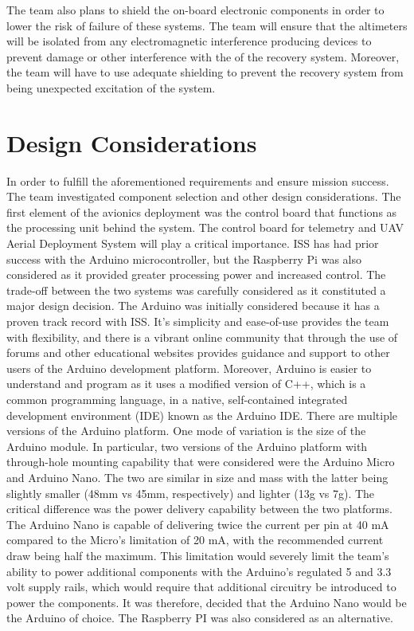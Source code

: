 The team also plans to shield the on-board electronic components in order to lower the risk of failure of these systems. The team will ensure that the altimeters will be isolated from any electromagnetic interference producing devices to prevent damage or other interference with the of the recovery system. Moreover, the team will have to use adequate shielding to prevent the recovery system from being unexpected excitation of the system.

\section{Design Considerations}

In order to fulfill the aforementioned requirements and ensure mission success. The team investigated component selection and other design considerations. The first element of the avionics deployment was the control board that functions as the processing unit behind the system.
The control board for telemetry and UAV Aerial Deployment System will play a critical importance. ISS has had prior success with the Arduino microcontroller, but the Raspberry Pi was also considered as it provided greater processing power and increased control. The trade-off between the two systems was carefully considered as it constituted a major design decision. 
	The Arduino was initially considered because it has a proven track record with ISS. It’s simplicity and ease-of-use provides the team with flexibility, and there is a vibrant online community that through the use of forums and other educational websites provides guidance and support to other users of the Arduino development platform. Moreover, Arduino is easier to understand and program as it uses a modified version of C++, which is a common programming language, in a native, self-contained integrated development environment (IDE) known as the Arduino IDE. 
	There are multiple versions of the Arduino platform. One mode of variation is the size of the Arduino module. In particular, two versions of the Arduino platform with through-hole mounting capability that were considered were the Arduino Micro and Arduino Nano. The two are similar in size and mass with the latter being slightly smaller (48mm vs 45mm, respectively) and lighter (13g vs 7g). The critical difference was the power delivery capability between the two platforms. The Arduino Nano is capable of delivering twice the current per pin at 40 mA compared to the Micro’s limitation of 20 mA, with the recommended current draw being half the maximum. This limitation would severely limit the team’s ability to power additional components with the Arduino’s regulated 5 and 3.3 volt supply rails, which would require that additional circuitry be introduced to power the components. It was therefore, decided that the Arduino Nano would be the Arduino of choice. The Raspberry PI was also considered as an alternative. \\\\
